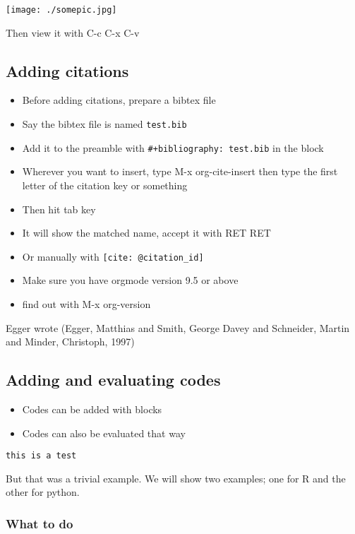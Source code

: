 \documentclass[11pt]{article}
\begin{document}
\begin{center}
\texttt{[image: ./somepic.jpg]}
\end{center}

Then view it with C-c C-x C-v

\subsection{Adding citations}
\label{sec:org12b5d25}
\begin{itemize}
\item Before adding citations, prepare a bibtex file
\item Say the bibtex file is named \texttt{test.bib}
\item Add it to the preamble with \texttt{\#+bibliography: test.bib} in the block
\item Wherever you want to insert, type M-x org-cite-insert then type the first letter of the citation key or something
\item Then hit tab key
\item It will show the matched name, accept it with RET RET
\item Or manually with \texttt{[cite: @citation\_id]}
\item Make sure you have orgmode version 9.5 or above
\item find out with M-x org-version
\end{itemize}

Egger wrote (Egger, Matthias and Smith, George Davey and Schneider, Martin and Minder, Christoph, 1997)


\subsection{Adding and evaluating  codes}
\label{sec:org75b4a5f}

\begin{itemize}
\item Codes can be added with blocks
\item Codes can also be evaluated that way
\end{itemize}

\begin{verbatim}
this is a test
\end{verbatim}

But that was a trivial example. We will show two examples; one for R and the other for python.

\subsubsection{What to do}
\label{sec:orgab6db51}
\end{document}
